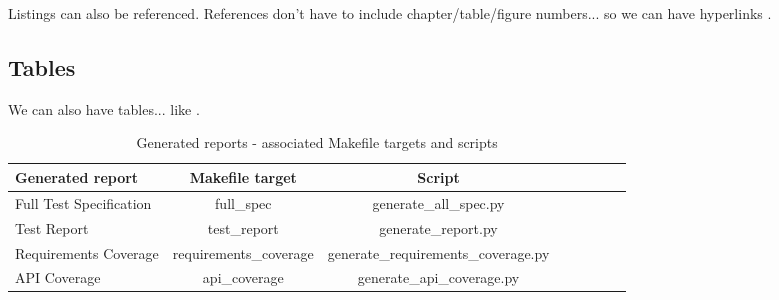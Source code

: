 Listings can also be referenced. References don't have to include chapter/table/figure numbers... so we can have hyperlinks .

\subsection{Tables}

We can also have tables... like .

\begin{center}
\begin{table}[htb]
  \caption{Generated reports - associated Makefile targets and scripts}
  \begin{tabular}{l*{6}{c}r}
    Generated report & Makefile target & Script \\
    \hline
    Full Test Specification & full_spec & generate_all_spec.py  \\
    Test Report & test_report & generate_report.py  \\
    Requirements Coverage & requirements_coverage &
    generate_requirements_coverage.py   \\
    API Coverage & api_coverage & generate_api_coverage.py  \\
  \end{tabular}
  \label{table:reports}
\end{table}
\end{center}
